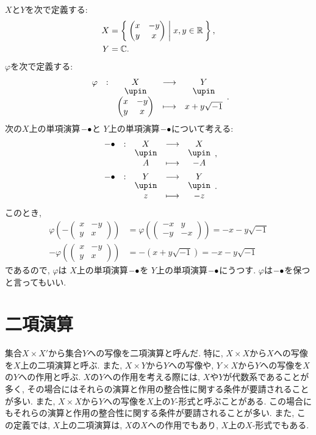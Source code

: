 \begin{example}
  $X$と$Y$を次で定義する:
  \begin{align*}
    X&=\Set{\begin{pmatrix}x&-y\\y&x\end{pmatrix}|x,y\in\mathbb{R}},\\
    Y&=\mathbb{C}.
  \end{align*}
  $\varphi$を次で定義する:
  \begin{align*}
    \shazo{\varphi}{X}{Y}
    {\begin{pmatrix}x&-y\\y&x\end{pmatrix}}{x+y\sqrt{-1}}.
  \end{align*}
  次の$X$上の単項演算$-{\bullet}$と
  $Y$上の単項演算$-{\bullet}$について考える: 
  \begin{align*}
    \shazo{-\tofu}{X}{X}
    {A}{-A},\\
    \shazo{-\tofu}{Y}{Y}
    {z}{-z}.
  \end{align*}
  このとき,
  \begin{align*}
    \varphi(-\begin{pmatrix}x&-y\\y&x\end{pmatrix})&=\varphi(\begin{pmatrix}-x&y\\-y&-x\end{pmatrix})=-x-y\sqrt{-1}\\
    -\varphi(\begin{pmatrix}x&-y\\y&x\end{pmatrix})&=-(x+y\sqrt{-1})=-x-y\sqrt{-1}
  \end{align*}
  であるので,
  $\varphi$は
  $X$上の単項演算$-{\bullet}$を
  $Y$上の単項演算$-{\bullet}$にうつす.
  $\varphi$は$-{\bullet}$を保つと言ってもいい.
\end{example}


\section{二項演算}
集合$X\times X'$から集合$Y$への写像を二項演算と呼んだ.
特に, $X\times X$から$X$への写像を$X$上の二項演算と呼ぶ.
また, $X\times Y$から$Y$への写像や,
 $Y\times X$から$Y$への写像を$X$の$Y$への作用と呼ぶ.
$X$の$Y$への作用を考える際には,
$X$や$Y$が代数系であることが多く,
その場合にはそれらの演算と作用の整合性に関する条件が要請されることが多い.
また, $X\times X$から$Y$への写像を$X$上の$Y$-形式と呼ぶことがある.
この場合にもそれらの演算と作用の整合性に関する条件が要請されることが多い.
また, この定義では, $X$上の二項演算は, $X$の$X$への作用でもあり,
$X$上の$X$-形式でもある.

